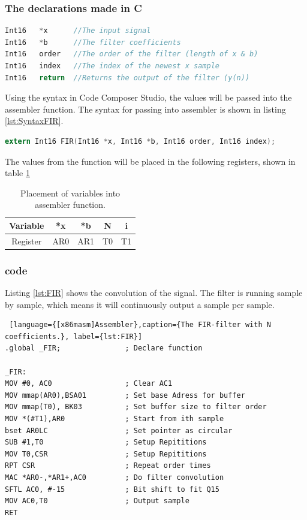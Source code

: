 \subsubsection{The declarations made in C}
\begin{lstlisting}[language={C},caption={Declaration of the needed variables.}, label={lst:variablesFIR} ]
Int16 	*x 		//The input signal
Int16	*b		//The filter coefficients
Int16	order	//The order of the filter (length of x & b)
Int16	index	//The index of the newest x sample
Int16	return	//Returns the output of the filter (y(n))
\end{lstlisting}

Using the syntax in Code Composer Studio, the values will be passed into the assembler function. The syntax for passing into assembler is shown in listing \ref{lst:SyntaxFIR}.
\begin{lstlisting}[language={C},caption={Function prototype.}, label={lst:SyntaxFIR}]
extern Int16 FIR(Int16 *x, Int16 *b, Int16 order, Int16 index);
\end{lstlisting}
The values from the function will be placed in the following registers, shown in table \ref{tab:Assemblerpassing}

\begin{table}[H]
	\centering
	\begin{tabular}{c|cccc}
		Variable & *x & *b & N & i \\ \hline
		Register & AR0 & AR1 & T0 & T1
	\end{tabular} 
	\caption{Placement of variables into assembler function.}
	\label{tab:Assemblerpassing}
\end{table}


\subsubsection{code}
Listing \ref{lst:FIR} shows the convolution of the signal. The filter is running sample by sample, which means it will continuously output a sample per sample.
\begin{lstlisting} [language={[x86masm]Assembler},caption={The FIR-filter with N coefficients.}, label={lst:FIR}]
.global _FIR;				; Declare function 

_FIR:	
MOV #0, AC0					; Clear AC1
MOV mmap(AR0),BSA01			; Set base Adress for buffer
MOV mmap(T0), BK03			; Set buffer size to filter order
MOV *(#T1),AR0				; Start from ith sample
bset AR0LC					; Set pointer as circular
SUB #1,T0					; Setup Repititions
MOV T0,CSR					; Setup Repititions
RPT CSR						; Repeat order times
MAC *AR0-,*AR1+,AC0 		; Do filter convolution
SFTL AC0, #-15				; Bit shift to fit Q15
MOV AC0,T0					; Output sample
RET
\end{lstlisting}



